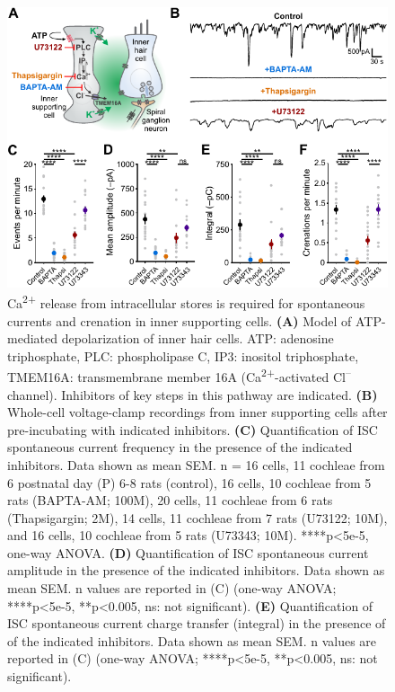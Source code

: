 \documentclass[9pt,lineno]{elife}
\begin{document}
\begin{figure}
\includegraphics[width=\linewidth]{figures/Fig1.pdf}
\caption{Ca\textsuperscript{2+} release from intracellular stores is required for spontaneous currents and crenation in inner supporting cells. 
\textbf{(A)} Model of ATP-mediated depolarization of inner hair cells. ATP: adenosine triphosphate, PLC: phospholipase C, IP3: inositol triphosphate, TMEM16A: transmembrane member 16A (Ca\textsuperscript{2+}-activated Cl\textsuperscript{--} channel). Inhibitors of key steps in this pathway are indicated. 
\textbf{(B)}	Whole-cell voltage-clamp recordings from inner supporting cells after pre-incubating with indicated inhibitors.
\textbf{(C)} Quantification of ISC spontaneous current frequency in the presence of the indicated inhibitors. Data shown as mean \textpm \hspace{0.2 mm} SEM. n = 16 cells, 11 cochleae from 6 postnatal day (P) 6-8 rats (control), 16 cells, 10 cochleae from 5 rats (BAPTA-AM; 100\textmu M), 20 cells, 11 cochleae from 6 rats (Thapsigargin; 2\textmu M), 14 cells, 11 cochleae from 7 rats (U73122; 10\textmu M), and 16 cells, 10 cochleae from 5 rats (U73343; 10\textmu M). ****p<5e-5, one-way ANOVA.
\textbf{(D)} Quantification of ISC spontaneous current amplitude in the presence of the indicated inhibitors. Data shown as mean \textpm \hspace{0.2 mm} SEM. n values are reported in (C) (one-way ANOVA; ****p<5e-5, **p<0.005, ns: not significant).
\textbf{(E)} Quantification of ISC spontaneous current charge transfer (integral) in the presence of  of the indicated inhibitors. Data shown as mean \textpm \hspace{0.2 mm} SEM. n values are reported in (C) (one-way ANOVA; ****p<5e-5, **p<0.005, ns: not significant).
}
\end{figure}
\end{document}
